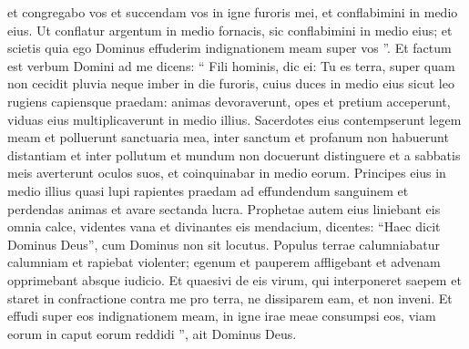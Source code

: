 \begin{biblechapter}
\begin{biblechapter}
\begin{biblechapter}
\begin{biblechapter}
\begin{biblechapter}
\begin{biblechapter}
\begin{biblechapter}
\begin{biblechapter}
\begin{biblechapter}
\begin{biblechapter}
\begin{biblechapter}
\begin{biblechapter}
\begin{biblechapter}
\begin{biblechapter}
\begin{biblechapter}
\begin{biblechapter}
\begin{biblechapter}
\begin{biblechapter}
\begin{biblechapter}
\begin{biblechapter}
\begin{biblechapter}
\begin{biblechapter}
\verse et congregabo vos et succendam vos in igne furoris mei, et conflabimini in medio eius. 
\verse Ut conflatur argentum in medio fornacis, sic conflabimini in medio eius; et scietis quia ego Dominus effuderim indignationem meam super vos ”.
 \verse Et factum est verbum Domini ad me dicens: 
\verse “ Fili hominis, dic ei: Tu es terra, super quam non cecidit pluvia neque imber in die furoris, 
\verse cuius duces in medio eius sicut leo rugiens capiensque praedam: animas devoraverunt, opes et pretium acceperunt, viduas eius multiplicaverunt in medio illius. 
\verse Sacerdotes eius contempserunt legem meam et polluerunt sanctuaria mea, inter sanctum et profanum non habuerunt distantiam et inter pollutum et mundum non docuerunt distinguere et a sabbatis meis averterunt oculos suos, et coinquinabar in medio eorum. 
\verse Principes eius in medio illius quasi lupi rapientes praedam ad effundendum sanguinem et perdendas animas et avare sectanda lucra. 
 \verse Prophetae autem eius liniebant eis omnia calce, videntes vana et divinantes eis mendacium, dicentes: “Haec dicit Dominus Deus”, cum Dominus non sit locutus. 
 \verse Populus terrae calumniabatur calumniam et rapiebat violenter; egenum et pauperem affligebant et advenam opprimebant absque iudicio. 
\verse Et quaesivi de eis virum, qui interponeret saepem et staret in confractione contra me pro terra, ne dissiparem eam, et non inveni. 
\verse Et effudi super eos indignationem meam, in igne irae meae consumpsi eos, viam eorum in caput eorum reddidi ”, ait Dominus Deus.
 

\end{biblechapter}
\end{biblechapter}
\end{biblechapter}
\end{biblechapter}
\end{biblechapter}
\end{biblechapter}
\end{biblechapter}
\end{biblechapter}
\end{biblechapter}
\end{biblechapter}
\end{biblechapter}
\end{biblechapter}
\end{biblechapter}
\end{biblechapter}
\end{biblechapter}
\end{biblechapter}
\end{biblechapter}
\end{biblechapter}
\end{biblechapter}
\end{biblechapter}
\end{biblechapter}
\end{biblechapter}
